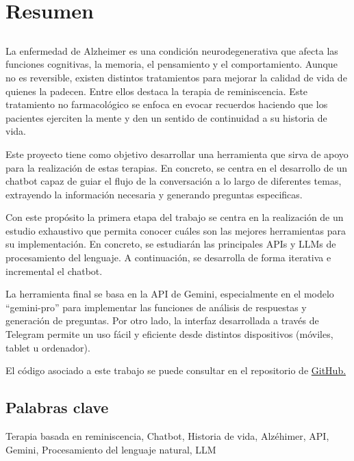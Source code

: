 \chapter*{Resumen}
\section*{\tituloPortadaVal}
La enfermedad de Alzheimer es una condición neurodegenerativa que afecta las funciones cognitivas, la memoria, el pensamiento y el comportamiento. Aunque no es reversible, existen distintos tratamientos para mejorar la calidad de vida de quienes la padecen.  Entre ellos destaca la terapia de reminiscencia. Este tratamiento no farmacológico se enfoca en evocar recuerdos haciendo que los pacientes ejerciten la mente y den un sentido de continuidad a su historia de vida.

Este proyecto tiene como objetivo desarrollar una herramienta que sirva de apoyo para la realización de estas terapias. En concreto, se centra en el desarrollo de un chatbot capaz de guiar el flujo de la conversación a lo largo de diferentes temas, extrayendo la información necesaria y generando preguntas especificas. 

Con este propósito la primera etapa del trabajo se centra en la realización de un estudio exhaustivo que permita conocer cuáles son las mejores herramientas para su implementación. En concreto, se estudiarán las principales APIs y LLMs de procesamiento del lenguaje.  A continuación, se desarrolla de forma iterativa e incremental el chatbot. 

La herramienta final se basa en la API de Gemini, especialmente en el modelo ``gemini-pro'' para implementar las funciones de análisis de respuestas y generación de preguntas. Por otro lado, la interfaz desarrollada a través de Telegram permite un uso fácil y eficiente desde distintos dispositivos (móviles, tablet u ordenador). 
 
El código asociado a este trabajo se puede consultar en el repositorio de \href{https://github.com/mavice07/TFG-ChatBotCantor.git}{GitHub.}

\section*{Palabras clave}
   
\noindent Terapia basada en reminiscencia, Chatbot, Historia de vida, Alzéhimer, API, Gemini, Procesamiento del lenguaje natural, LLM

   


